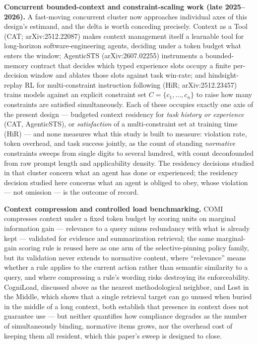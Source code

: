 \documentclass[11pt]{article}
\begin{document}
\textbf{Concurrent bounded-context and constraint-scaling work (late 2025--2026).} A fast-moving concurrent cluster now approaches individual axes of this design's estimand, and the delta is worth conceding precisely. Context as a Tool (CAT; arXiv:2512.22087) makes context management itself a learnable tool for long-horizon software-engineering agents, deciding under a token budget what enters the window; AgenticSTS (arXiv:2607.02255) instruments a bounded-memory contract that decides which typed experience slots occupy a finite per-decision window and ablates those slots against task win-rate; and hindsight-replay RL for multi-constraint instruction following (HiR; arXiv:2512.23457) trains models against an explicit constraint set $C = \{c_1, \dots, c_n\}$ to raise how many constraints are satisfied simultaneously. Each of these occupies exactly one axis of the present design --- budgeted context residency for \emph{task history or experience} (CAT, AgenticSTS), or \emph{satisfaction} of a multi-constraint set at training time (HiR) --- and none measures what this study is built to measure: violation rate, token overhead, and task success jointly, as the count of standing \emph{normative} constraints sweeps from single digits to several hundred, with count deconfounded from raw prompt length and applicability density. The residency decisions studied in that cluster concern what an agent has done or experienced; the residency decision studied here concerns what an agent is obliged to obey, whose violation --- not omission --- is the outcome of record.

\textbf{Context compression and controlled load benchmarking.} COMI compresses context under a fixed token budget by scoring units on marginal information gain --- relevance to a query minus redundancy with what is already kept --- validated for evidence and summarization retrieval; the same marginal-gain scoring rule is reused here as one arm of the selective-pinning policy family, but its validation never extends to normative content, where ``relevance'' means whether a rule applies to the current action rather than semantic similarity to a query, and where compressing a rule's wording risks destroying its enforceability. CogniLoad, discussed above as the nearest methodological neighbor, and Lost in the Middle, which shows that a single retrieval target can go unused when buried in the middle of a long context, both establish that presence in context does not guarantee use --- but neither quantifies how compliance degrades as the number of simultaneously binding, normative items grows, nor the overhead cost of keeping them all resident, which this paper's sweep is designed to close.
\end{document}
